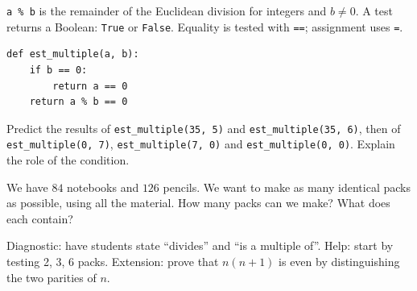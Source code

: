 \begin{method}
\texttt{a \% b} is the remainder of the Euclidean division for integers and $b\ne0$. A test returns a Boolean: \texttt{True} or \texttt{False}. Equality is tested with \texttt{==}; assignment uses \texttt{=}.
\end{method}
\begin{lstlisting}
def est_multiple(a, b):
    if b == 0:
        return a == 0
    return a % b == 0
\end{lstlisting}
\begin{example}Predict the results of \texttt{est\_multiple(35, 5)} and \texttt{est\_multiple(35, 6)}, then of \texttt{est\_multiple(0, 7)}, \texttt{est\_multiple(7, 0)} and \texttt{est\_multiple(0, 0)}. Explain the role of the condition.\end{example}
\begin{example}[Problem]We have $84$ notebooks and $126$ pencils. We want to make as many identical packs as possible, using all the material. How many packs can we make? What does each contain?\end{example}
\begin{teachernote}Diagnostic: have students state ``divides'' and ``is a multiple of''. Help: start by testing 2, 3, 6 packs. Extension: prove that $n(n+1)$ is even by distinguishing the two parities of $n$.\end{teachernote}
